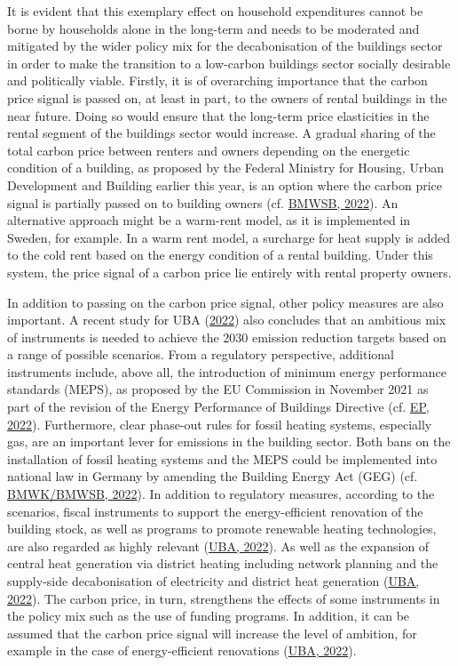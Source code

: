 \documentclass[12pt,twoside]{reedthesis}
\begin{document}
It is evident that this exemplary effect on household expenditures cannot be borne by households alone in the long-term and needs to be moderated and mitigated by the wider policy mix for the decabonisation of the buildings sector in order to make the transition to a low-carbon buildings sector socially desirable and politically viable. Firstly, it is of overarching importance that the carbon price signal is passed on, at least in part, to the owners of rental buildings in the near future. Doing so would ensure that the long-term price elasticities in the rental segment of the buildings sector would increase. A gradual sharing of the total carbon price between renters and owners depending on the energetic condition of a building, as proposed by the Federal Ministry for Housing, Urban Development and Building earlier this year, is an option where the carbon price signal is partially passed on to building owners (cf. \protect\hyperlink{ref-bmwsb22}{BMWSB, 2022}). An alternative approach might be a warm-rent model, as it is implemented in Sweden, for example. In a warm rent model, a surcharge for heat supply is added to the cold rent based on the energy condition of a rental building. Under this system, the price signal of a carbon price lie entirely with rental property owners.

In addition to passing on the carbon price signal, other policy measures are also important. A recent study for UBA (\protect\hyperlink{ref-uba22}{2022}) also concludes that an ambitious mix of instruments is needed to achieve the 2030 emission reduction targets based on a range of possible scenarios. From a regulatory perspective, additional instruments include, above all, the introduction of minimum energy performance standards (MEPS), as proposed by the EU Commission in November 2021 as part of the revision of the Energy Performance of Buildings Directive (cf. \protect\hyperlink{ref-ep22}{EP, 2022}). Furthermore, clear phase-out rules for fossil heating systems, especially gas, are an important lever for emissions in the building sector. Both bans on the installation of fossil heating systems and the MEPS could be implemented into national law in Germany by amending the Building Energy Act (GEG) (cf. \protect\hyperlink{ref-bmwkux2fbmwsb22}{BMWK/BMWSB, 2022}). In addition to regulatory measures, according to the scenarios, fiscal instruments to support the energy-efficient renovation of the building stock, as well as programs to promote renewable heating technologies, are also regarded as highly relevant (\protect\hyperlink{ref-uba22}{UBA, 2022}). As well as the expansion of central heat generation via district heating including network planning and the supply-side decabonisation of electricity and district heat generation (\protect\hyperlink{ref-uba22}{UBA, 2022}). The carbon price, in turn, strengthens the effects of some instruments in the policy mix such as the use of funding programs. In addition, it can be assumed that the carbon price signal will increase the level of ambition, for example in the case of energy-efficient renovations (\protect\hyperlink{ref-uba22}{UBA, 2022}).
\end{document}
